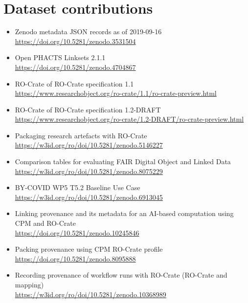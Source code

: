 \section{Dataset contributions}

\begin{itemize}
  \item
    Zenodo metadata JSON records as of 2019-09-16\\
    \url{https://doi.org/10.5281/zenodo.3531504}
  \item
    Open PHACTS Linksets 2.1.1\\
    \url{https://doi.org/10.5281/zenodo.4704867}
  \item
    RO-Crate of RO-Crate specification 1.1 \cite{RO-Crate 1.1.3} \\
    \url{https://www.researchobject.org/ro-crate/1.1/ro-crate-preview.html}
  \item 
    RO-Crate of RO-Crate specification 1.2-DRAFT \cite{RO-Crate 1.2} \\
    \url{https://www.researchobject.org/ro-crate/1.2-DRAFT/ro-crate-preview.html}      
  \item Packaging research artefacts with RO-Crate \cite{Soiland-Reyes 2022g} \\ 
    \url{https://w3id.org/ro/doi/10.5281/zenodo.5146227}
  \item Comparison tables for evaluating FAIR Digital Object and Linked Data \cite{Soiland-Reyes 2023a} \\
    \url{https://w3id.org/ro/doi/10.5281/zenodo.8075229}
  \item BY-COVID WP5 T5.2 Baseline Use Case \\
    \url{https://w3id.org/ro/doi/10.5281/zenodo.6913045}
  \item Linking provenance and its metadata for an AI-based computation using CPM and RO-Crate \\
    \url{https://doi.org/10.5281/zenodo.10245846}
    \item
    Packing provenance using CPM RO-Crate profile \cite{Wittner 2023c} \\
    \url{https://doi.org/10.5281/zenodo.8095888}
  \item Recording provenance of workflow runs with RO-Crate (RO-Crate and mapping) \cite{Leo 2023c} \\ 
    \url{https://w3id.org/ro/doi/10.5281/zenodo.10368989}


    
\end{itemize}


